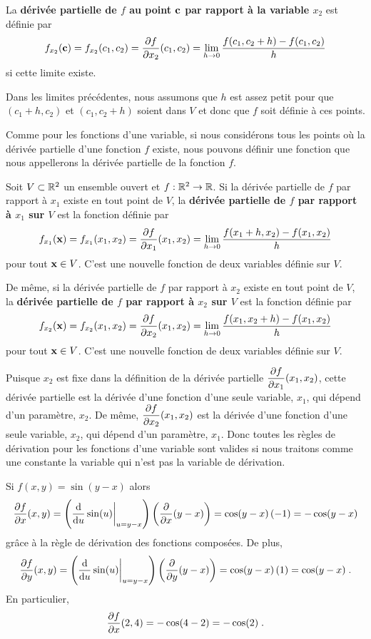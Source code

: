 {\begin{focus}{\dfn}
La {\bfseries dérivée partielle de $f$ au point $\VEC{c}$ par rapport à la
variable $x_2$} est définie par
\[
f_{x_2}(\VEC{c}) = f_{x_2}(c_1,c_2) 
= \pdydx{f}{x_2}(c_1,c_2)
= \lim_{h\rightarrow 0}\frac{f(c_1,c_2+h)-f(c_1,c_2)}{h}
\]
si cette limite existe.

Dans les limites précédentes, nous assumons que $h$ est assez petit pour que
$(c_1+h,c_2)$ et $(c_1,c_2+h)$ soient dans $V$ et donc que $f$ soit définie à
ces points.
\end{focus}

Comme pour les fonctions d'une variable, si nous considérons tous les points où
la dérivée partielle d'une fonction $f$ existe, nous pouvons définir
une fonction que nous appellerons la dérivée partielle de la fonction $f$.

\begin{focus}{\dfn} 
Soit $V\subset \RR^2$ un ensemble ouvert et $f:\RR^2 \rightarrow \RR$.  Si
la dérivée partielle de $f$ par rapport à $x_1$ existe en tout point de $V$,
la {\bfseries dérivée partielle de $f$ par rapport à $x_1$ sur $V$} est la
fonction définie par
\[
f_{x_1}(\VEC{x}) = f_{x_1}(x_1,x_2) 
= \pdydx{f}{x_1}(x_1,x_2)
= \lim_{h\rightarrow 0}\frac{f(x_1+h,x_2)-f(x_1,x_2)}{h}
\]
pour tout $\VEC{x}\in V$.  C'est une nouvelle fonction de deux variables
définie sur $V$.

De même, si la dérivée partielle de $f$ par rapport à $x_2$ existe en tout
point de $V$, la {\bfseries dérivée partielle de $f$ par rapport à $x_2$ sur
$V$} est la fonction définie par
\[
f_{x_2}(\VEC{x}) = f_{x_2}(x_1,x_2) 
= \pdydx{f}{x_2}(x_1,x_2)
= \lim_{h\rightarrow 0}\frac{f(x_1,x_2+h)-f(x_1,x_2)}{h}
\]
pour tout $\VEC{x}\in V$.  C'est une nouvelle fonction de deux variables
définie sur $V$.
\end{focus}

Puisque $x_2$ est fixe dans la définition de la dérivée partielle
$\displaystyle \pdydx{f}{x_1}(x_1,x_2)$, cette dérivée partielle est la
dérivée d'une fonction d'une seule variable, $x_1$, qui dépend d'un
paramètre, $x_2$.  De même, $\displaystyle \pdydx{f}{x_2}(x_1,x_2)$ est
la dérivée d'une fonction d'une seule variable, $x_2$, qui dépend d'un
paramètre, $x_1$.  Donc toutes les règles de dérivation pour les
fonctions d'une variable sont valides si nous traitons comme une constante
la variable qui n'est pas la variable de dérivation.

\begin{egg}
Si $f(x,y) = \sin(y-x)$ alors
\[
\pdydx{f}{x}(x,y) =
\left(\dfdx{\sin(u)}{u}\bigg|_{u=y-x}\right)
\left(\pdfdx{(y-x)}{x} \right)
= \cos(y-x)\,(-1) = -\cos(y-x)
\]
grâce à la règle de dérivation des fonctions composées. De plus,
\[
\pdydx{f}{y}(x,y) =
\left(\dfdx{\sin(u)}{u}\bigg|_{u=y-x}\right)
\left(\pdfdx{(y-x)}{y} \right)
= \cos(y-x)\,(1) = \cos(y-x) \; .
\]
En particulier,
\[
\pdydx{f}{x}(2,4) = -\cos(4-2) = -\cos(2) \; .
\]
\end{egg}

}
